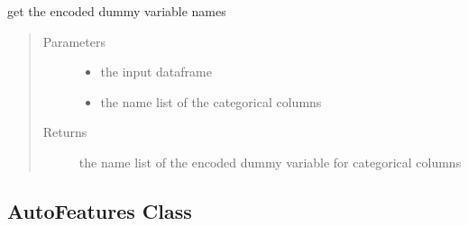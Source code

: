 \documentclass[letterpaper,11pt,english]{sphinxmanual}
\begin{document}
\begin{fulllineitems}
\begin{fulllineitems}
\end{fulllineitems}


\begin{fulllineitems}
\label{\detokenize{auto_feature:AutoFeatures.AutoFeatures.get_encoded_names}}
get the encoded dummy variable names
\begin{quote}\begin{description}
\item[{Parameters}] \leavevmode\begin{itemize}
\item {} 
 \textendash{} the input dataframe

\item {} 
 \textendash{} the name list of the categorical columns

\end{itemize}

\item[{Returns}] \leavevmode
the name list of the encoded dummy variable for categorical columns

\end{description}\end{quote}

\end{fulllineitems}


\end{fulllineitems}



\subsection{AutoFeatures Class}
\label{\detokenize{auto_feature:id1}}
\end{document}
